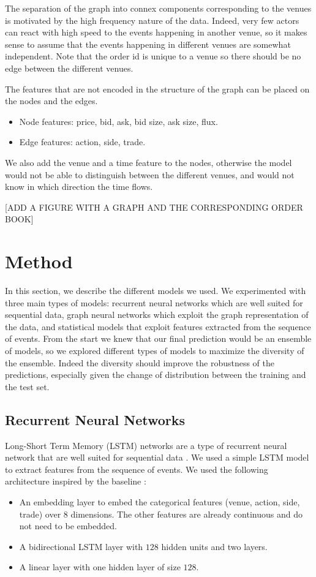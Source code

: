 \documentclass[switch, 11pt]{article}
\begin{document}
\begin{multicols}{2}
    The separation of the graph into connex components corresponding to the venues is motivated by the high frequency nature of the data. Indeed, very few actors can react with high speed to the events happening in another venue, so it makes sense to assume that the events happening in different venues are somewhat independent. Note that the order id is unique to a venue so there should be no edge between the different venues.

    The features that are not encoded in the structure of the graph can be placed on the nodes and the edges.
    \begin{itemize}
        \item Node features: price, bid, ask, bid size, ask size, flux.
        \item Edge features: action, side, trade.
    \end{itemize}
    We also add the venue and a time feature to the nodes, otherwise the model would not be able to distinguish between the different venues, and would not know in which direction the time flows.

        [ADD A FIGURE WITH A GRAPH AND THE CORRESPONDING ORDER BOOK]

    \section{Method}

    In this section, we describe the different models we used. We experimented with three main types of models: recurrent neural networks which are well suited for sequential data, graph neural networks which exploit the graph representation of the data, and statistical models that exploit features extracted from the sequence of events. From the start we knew that our final prediction would be an ensemble of models, so we explored different types of models to maximize the diversity of the ensemble. Indeed the diversity should improve the robustness of the predictions, especially given the change of distribution between the training and the test set.

    \subsection{Recurrent Neural Networks}

    Long-Short Term Memory (LSTM) networks are a type of recurrent neural network that are well suited for sequential data \cite{hochreiter-1997}. We used a simple LSTM model to extract features from the sequence of events. We used the following architecture inspired by the baseline :
    \begin{itemize}
        \item An embedding layer to embed the categorical features (venue, action, side, trade) over $8$ dimensions. The other features are already continuous and do not need to be embedded.
        \item A bidirectional LSTM layer with $128$ hidden units and two layers.
        \item A linear layer with one hidden layer of size $128$.
    \end{itemize}


\end{multicols}
\end{document}

